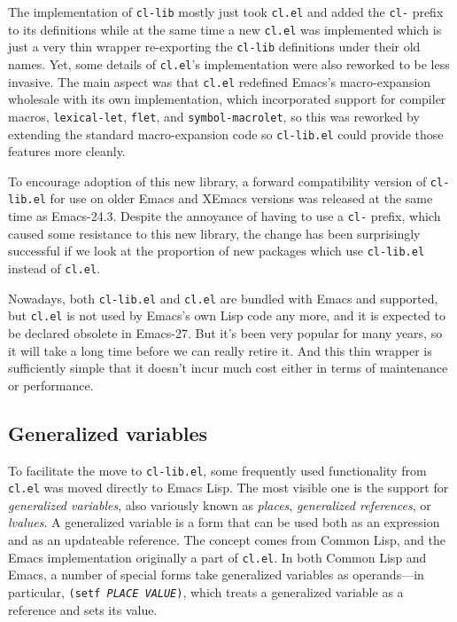 \documentclass[format=acmsmall, review]{acmart}
\newcommand \Elisp {Emacs Lisp}
\newcommand \id[1] {\textrm{\textsl{#1}}}
\begin{document}
The implementation of \texttt{cl-lib} mostly just took \texttt{cl.el} and
added the \texttt{cl-} prefix to its definitions while at the same time
a new \texttt{cl.el} was implemented which is just a very thin wrapper
re-exporting the \texttt{cl-lib} definitions under their old names.  Yet,
some details of \texttt{cl.el}'s implementation were also reworked to be
less invasive.  The main aspect was that \texttt{cl.el} redefined Emacs's
macro-expansion wholesale with its own implementation, which incorporated
support for compiler macros, \texttt{lexical-let}, \texttt{flet}, and
\texttt{symbol-macrolet}, so this was reworked by extending the standard
macro-expansion code so \texttt{cl-lib.el} could provide those features
more cleanly.

To encourage adoption of this new library, a forward compatibility version
of \texttt{cl-lib.el} for use on older Emacs and XEmacs versions was
released at the same time as Emacs-24.3.  Despite the annoyance of having to
use a \texttt{cl-} prefix, which caused some resistance to this new library,
the change has been surprisingly successful if we look at the proportion of
new packages which use \texttt{cl-lib.el} instead of \texttt{cl.el}.

Nowadays, both \texttt{cl-lib.el} and \texttt{cl.el} are bundled with Emacs
and supported, but \texttt{cl.el} is not used by Emacs's own Lisp code any
more, and it is expected to be declared obsolete in Emacs-27.
But it's been very popular for many years, so it will take a long time
before we can really retire it.  And this thin wrapper is sufficiently
simple that it doesn't incur much cost either in terms of maintenance
or performance.

\subsection{Generalized variables} %
\label{sec:generalized-variables}

To facilitate the move to \texttt{cl-lib.el}, some frequently used
functionality from \texttt{cl.el} was moved directly to \Elisp{}.  The most
visible one is the support for \emph{generalized variables}, also variously
known as \emph{places}, \emph{generalized references}, or \emph{lvalues}.
A generalized variable is a form that can be used both as an expression and
as an updateable reference.  The concept comes from Common Lisp, and the
Emacs implementation originally a part of \texttt{cl.el}.  In both Common
Lisp and Emacs, a number of special forms take generalized variables as
operands---in particular, \texttt{(setf \id{PLACE} \id{VALUE})}, which treats
a generalized variable as a reference and sets its value.
\end{document}
